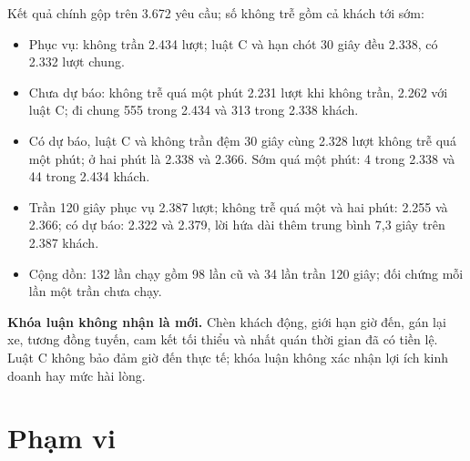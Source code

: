 Kết quả chính gộp trên 3.672 yêu cầu; số không trễ gồm cả khách tới sớm:
\begin{itemize}[leftmargin=0.7cm,itemsep=2pt,topsep=3pt]
\item Phục vụ: không trần 2.434 lượt; luật C và hạn chót 30 giây đều 2.338, có 2.332 lượt chung.
\item Chưa dự báo: không trễ quá một phút 2.231 lượt khi không trần, 2.262 với luật C; đi chung 555 trong
2.434 và 313 trong 2.338 khách.
\item Có dự báo, luật C và không trần đệm 30 giây cùng 2.328 lượt không trễ quá một phút; ở hai phút là
2.338 và 2.366. Sớm quá một phút: 4 trong 2.338 và 44 trong 2.434 khách.
\item Trần 120 giây phục vụ 2.387 lượt; không trễ quá một và hai phút: 2.255 và 2.366; có dự báo: 2.322 và
2.379, lời hứa dài thêm trung bình 7,3 giây trên 2.387 khách.
\item Cộng dồn: 132 lần chạy gồm 98 lần cũ và 34 lần trần 120 giây; đối chứng mỗi lần một trần chưa chạy.
\end{itemize}

\begin{khungy}
\textbf{Khóa luận không nhận là mới.}
Chèn khách động, giới hạn giờ đến, gán lại xe, tương đồng tuyến, cam kết tối thiểu và nhất quán thời gian đã
có tiền lệ. Luật C không bảo đảm giờ đến thực tế; khóa luận không xác nhận lợi ích kinh doanh hay mức hài lòng.
\end{khungy}

\section{Phạm vi}
\label{muc:c1-phamvi}

